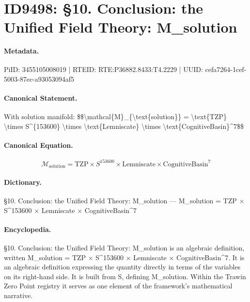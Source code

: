 \section*{ID9498: §10. Conclusion: the Unified Field Theory: M\_solution}
\paragraph{Metadata.}
PiID: 3455105008019 | RTEID: RTE:P36882.8433:T4.2229 | UUID: cefa7264-1cef-5003-87ec-a93053094af5

\paragraph{Canonical Statement.}
With solution manifold: \$\$\textbackslash{}mathcal\{M\}\_\{\textbackslash{}text\{solution\}\} = \textbackslash{}text\{TZP\} \textbackslash{}times S\textasciicircum{}\{153600\} \textbackslash{}times \textbackslash{}text\{Lemniscate\} \textbackslash{}times \textbackslash{}text\{CognitiveBasin\}\textasciicircum{}7\$\$

\paragraph{Canonical Equation.}
\[
\mathcal{M}_{\text{solution}} = \text{TZP} \times S^{153600} \times \text{Lemniscate} \times \text{CognitiveBasin}^7
\]

\paragraph{Dictionary.}
§10. Conclusion: the Unified Field Theory: M\_solution — M\_solution = TZP × S\textasciicircum{}153600 × Lemniscate × CognitiveBasin\textasciicircum{}7

\paragraph{Encyclopedia.}
§10. Conclusion: the Unified Field Theory: M\_solution is an algebraic definition, written M\_solution = TZP × S\textasciicircum{}153600 × Lemniscate × CognitiveBasin\textasciicircum{}7. It is an algebraic definition expressing the quantity directly in terms of the variables on its right-hand side. It is built from S, defining M\_solution. Within the Trawin Zero Point registry it serves as one element of the framework's mathematical narrative.
